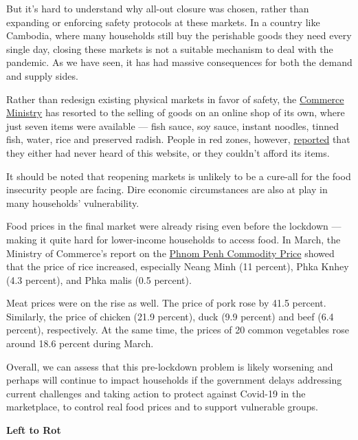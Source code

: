 \documentclass[10pt,a4paper]{letter}
\begin{document}
But it's hard to understand why all-out closure was chosen, rather than expanding or enforcing safety protocols at these markets. In a country like Cambodia, where many households still buy the perishable goods they need every single day, closing these markets is not a suitable mechanism to deal with the pandemic. As we have seen, it has had massive consequences for both the demand and supply sides.

Rather than redesign existing physical markets in favor of safety, the \href{https://shop.moc.gov.kh/collections/all}{Commerce Ministry} has resorted to the selling of goods on an online shop of its own, where just seven items were available --- fish sauce, soy sauce, instant noodles, tinned fish, water, rice and preserved radish. People in red zones, however, \href{https://restofworld.org/2021/canned-fish-water-and-rice-online-shopping-in-cambodias-government-run-nearly-empty-pandemic-store/?utm_source=rss&utm_medium=rss&utm_campaign=feeds}{reported} that they either had never heard of this website, or they couldn't afford its items.

It should be noted that reopening markets is unlikely to be a cure-all for the food insecurity people are facing. Dire economic circumstances are also at play in many households' vulnerability.

Food prices in the final market were already rising even before the lockdown --- making it quite hard for lower-income households to access food. In March, the Ministry of Commerce's report on the \href{http://www.moc.gov.kh/Portals/0/Docs/TradeInfo/CPS/MonthlyPrice Index_Weekly Report-Mar-2021-20210402113524119.pdf}{Phnom Penh Commodity Price} showed that the price of rice increased, especially Neang Minh (11 percent), Phka Knhey (4.3 percent), and Phka malis (0.5 percent).

Meat prices were on the rise as well. The price of pork rose by 41.5 percent. Similarly, the price of chicken (21.9 percent), duck (9.9 percent) and beef (6.4 percent), respectively. At the same time, the prices of 20 common vegetables rose around 18.6 percent during March.

Overall, we can assess that this pre-lockdown problem is likely worsening and perhaps will continue to impact households if the government delays addressing current challenges and taking action to protect against Covid-19 in the marketplace, to control real food prices and to support vulnerable groups.

\textbf{Left to Rot}
\end{document}
